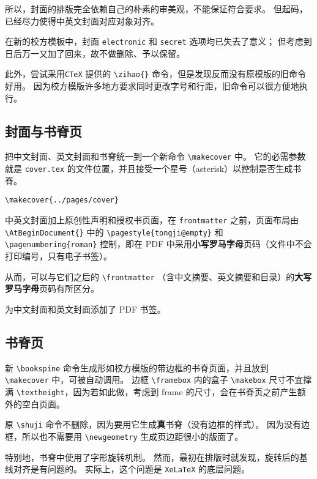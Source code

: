 \documentclass[../Main/thesis.tex]{subfiles}
\begin{document}
所以，封面的排版完全依赖自己的朴素的审美观，不能保证符合要求。
但起码，已经尽力使得中英文封面对应对象对齐。

在新的校方模板中，封面 \texttt{electronic} 和 \texttt{secret}
选项均已失去了意义； 但考虑到日后万一又加了回来，故不做删除、予以保留。

此外，尝试采用\texttt{CTeX} 提供的 \texttt{\textbackslash{}zihao\{\}}
命令，但是发现反而没有原模版的旧命令好用。
因为校方模版许多地方要求同时更改字号和行距，旧命令可以很方便地执行。

\subsection{封面与书脊页}

把中文封面、英文封面和书脊统一到一个新命令
\texttt{\textbackslash{}makecover} 中。 它的必需参数就是
\texttt{cover.tex}
的文件位置，并且接受一个星号（asterisk）以控制是否生成书脊。

\texttt{\textbackslash{}makecover\{../pages/cover\}}

中英文封面加上原创性声明和授权书页面，在 \texttt{frontmatter}
之前，页面布局由 \texttt{\textbackslash{}AtBeginDocument\{\}} 中的
\texttt{\textbackslash{}pagestyle\{tongji@empty\}} 和
\texttt{\textbackslash{}pagenumbering\{roman\}} 控制，即在 PDF
中采用\textbf{小写罗马字母}页码（文件中不会打印编号，只有电子书签）。

从而，可以与它们之后的 \texttt{\textbackslash{}frontmatter}
（含中文摘要、英文摘要和目录）的\textbf{大写罗马字母}页码有所区分。

为中文封面和英文封面添加了 PDF 书签。

\subsection{书脊页}

新 \texttt{\textbackslash{}bookspine}
命令生成形如校方模版的带边框的书脊页面，并且放到
\texttt{\textbackslash{}makecover} 中，可被自动调用。 边框
\texttt{\textbackslash{}framebox} 内的盒子
\texttt{\textbackslash{}makebox} 尺寸不宜撑满
\texttt{\textbackslash{}textheight}，因为若如此做，考虑到 frame
的尺寸，会在书脊页之前产生额外的空白页面。

原 \texttt{\textbackslash{}shuji}
命令不删除，因为要用它生成\textbf{真}书脊（没有边框的样式）。
因为没有边框，所以也不需要用 \texttt{\textbackslash{}newgeometry}
生成页边距很小的版面了。

特别地，书脊中使用了字形旋转机制。
然而，最初在排版时就发现，旋转后的基线对齐是有问题的。
实际上，这个问题是 \texttt{XeLaTeX} 的底层问题。
\end{document}
